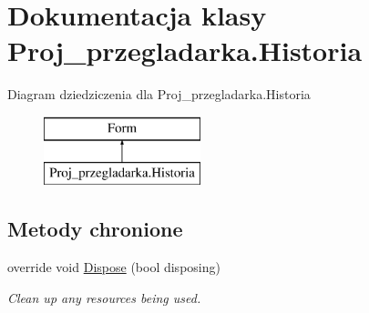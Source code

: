 \hypertarget{class_proj__przegladarka_1_1_historia}{}\section{Dokumentacja klasy Proj\+\_\+przegladarka.\+Historia}
\label{class_proj__przegladarka_1_1_historia}
Diagram dziedziczenia dla Proj\+\_\+przegladarka.\+Historia\begin{figure}[H]
\begin{center}
\leavevmode
\includegraphics[height=2.000000cm]{class_proj__przegladarka_1_1_historia}
\end{center}
\end{figure}
\subsection*{Metody chronione}
\begin{DoxyCompactItemize}
\item 
override void \mbox{\hyperlink{class_proj__przegladarka_1_1_historia_a53cfdbbd281c2f39d9d81533c7d8555c}{Dispose}} (bool disposing)
\begin{DoxyCompactList}\small\item\em Clean up any resources being used. \end{DoxyCompactList}\end{DoxyCompactItemize}
